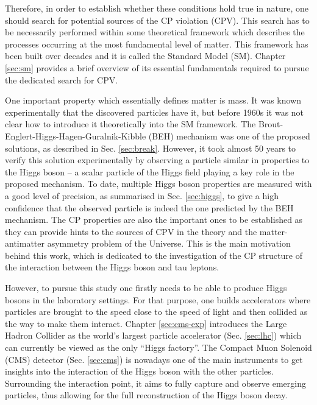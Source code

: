 Therefore, in order to establish whether these conditions hold true in nature, one should search for potential sources of the CP violation (CPV). This search has to be necessarily performed within some theoretical framework which describes the processes occurring at the most fundamental level of matter. This framework has been built over decades and it is called the Standard Model (SM). Chapter \ref{sec:sm} provides a brief overview of its essential fundamentals required to pursue the dedicated search for CPV. 

One important property which essentially defines matter is mass. It was known experimentally that the discovered particles have it, but before 1960s it was not clear how to introduce it theoretically into the SM framework. The Brout-Englert-Higgs-Hagen-Guralnik-Kibble (BEH) mechanism was one of the proposed solutions, as described in Sec. \ref{sec:break}. However, it took almost 50 years to verify this solution experimentally by observing a particle similar in properties to the Higgs boson -- a scalar particle of the Higgs field playing a key role in the proposed mechanism. To date, multiple Higgs boson properties are measured with a good level of precision, as summarised in Sec. \ref{sec:higgs}, to give a high confidence that the observed particle is indeed the one predicted by the BEH mechanism. The CP properties are also the important ones to be established as they can provide hints to the sources of CPV in the theory and the matter-antimatter asymmetry problem of the Universe. This is the main motivation behind this work, which is dedicated to the investigation of the CP structure of the interaction between the Higgs boson and tau leptons.  

However, to pursue this study one firstly needs to be able to produce Higgs bosons in the laboratory settings. For that purpose, one builds accelerators where particles are brought to the speed close to the speed of light and then collided as the way to make them interact. Chapter \ref{sec:cms-exp} introduces the Large Hadron Collider as the world's largest particle accelerator (Sec. \ref{sec:lhc}) which can currently be viewed as the only \enquote{Higgs factory}. The Compact Muon Solenoid (CMS) detector (Sec. \ref{sec:cms}) is nowadays one of the main instruments to get insights into the interaction of the Higgs boson with the other particles. Surrounding the interaction point, it aims to fully capture and observe emerging particles, thus allowing for the full reconstruction of the Higgs boson decay.

